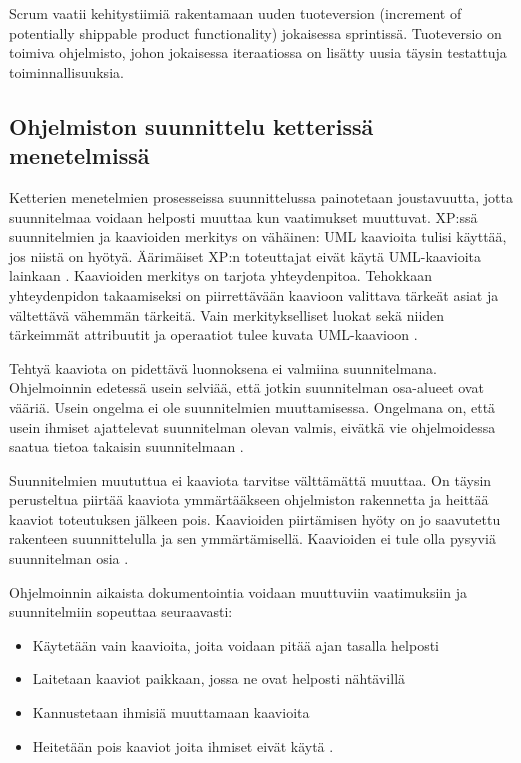 \documentclass[finnish]{tktltiki2}
\theoremstyle{definition}
\theoremstyle{remark}
\begin{document}
Scrum vaatii kehitystiimiä rakentamaan uuden tuoteversion (increment of potentially shippable product functionality) jokaisessa sprintissä. Tuoteversio on toimiva ohjelmisto, johon jokaisessa iteraatiossa on lisätty uusia täysin testattuja toiminnallisuuksia.

\subsection{Ohjelmiston suunnittelu ketterissä menetelmissä}

Ketterien menetelmien prosesseissa suunnittelussa painotetaan joustavuutta, jotta suunnitelmaa voidaan helposti muuttaa kun vaatimukset muuttuvat. XP:ssä suunnitelmien ja kaavioiden merkitys on vähäinen: UML kaavioita tulisi käyttää, jos niistä on hyötyä. Äärimäiset XP:n toteuttajat eivät käytä UML-kaavioita lainkaan \cite{FOW01b}. Kaavioiden merkitys on tarjota yhteydenpitoa. Tehokkaan yhteydenpidon takaamiseksi on piirrettävään kaavioon valittava tärkeät asiat ja vältettävä vähemmän tärkeitä. Vain merkitykselliset luokat sekä niiden tärkeimmät attribuutit ja operaatiot tulee kuvata UML-kaavioon \cite{FOW01b}.

Tehtyä kaaviota on pidettävä luonnoksena ei valmiina suunnitelmana. Ohjelmoinnin edetessä usein selviää, että jotkin suunnitelman osa-alueet ovat vääriä. Usein ongelma ei ole suunnitelmien muuttamisessa. Ongelmana on, että usein ihmiset ajattelevat suunnitelman olevan valmis, eivätkä vie ohjelmoidessa saatua tietoa takaisin suunnitelmaan \cite{FOW01b}.

Suunnitelmien muututtua ei kaaviota tarvitse välttämättä muuttaa. On täysin perusteltua piirtää kaaviota ymmärtääkseen ohjelmiston rakennetta ja heittää kaaviot toteutuksen jälkeen pois. Kaavioiden piirtämisen hyöty on jo saavutettu rakenteen suunnittelulla ja sen ymmärtämisellä. Kaavioiden ei tule olla pysyviä suunnitelman osia \cite{FOW01b}.

Ohjelmoinnin aikaista dokumentointia voidaan muuttuviin vaatimuksiin ja suunnitelmiin sopeuttaa seuraavasti:

\begin{itemize}
 \item Käytetään vain kaavioita, joita voidaan pitää ajan tasalla helposti 
 \item Laitetaan kaaviot paikkaan, jossa ne ovat helposti nähtävillä
 \item Kannustetaan ihmisiä muuttamaan kaavioita
 \item Heitetään pois kaaviot joita ihmiset eivät käytä \cite{FOW01b}.
\end{itemize}
\end{document}
